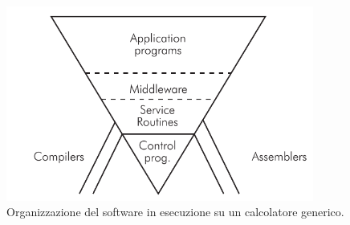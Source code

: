 \begin{figure}
    \centering
    \includegraphics[width=0.9\textwidth]{figs/chapter2/software_pyramid.png}
    \caption{Organizzazione del software in esecuzione su un calcolatore generico.}
    \label{fig:sw_pyramid}
\end{figure}

